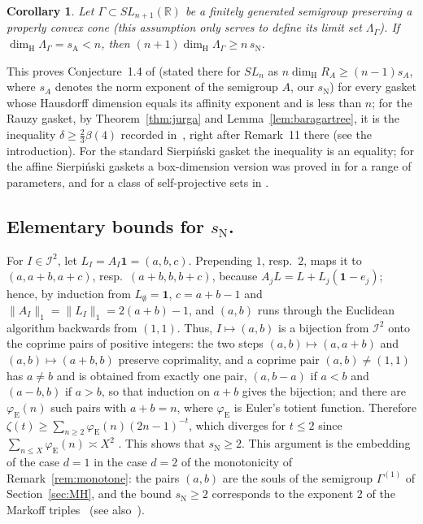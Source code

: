 \documentclass[11pt]{amsart}
\newtheorem{corollary}[proposition]{Corollary}
\theoremstyle{definition}
\theoremstyle{remark}
\newcommand{\one}{\mathbf 1}
\newcommand{\R}{\mathbb R}
\newcommand{\cI}{\mathcal I}
\newcommand{\sN}{s_{\mathrm N}}
\newcommand{\sA}{s_{\mathrm A}}
\newcommand{\dimH}{\dim_{\mathrm H}}
\newcommand{\norm}[1]{\lVert #1\rVert}
\begin{document}
\begin{corollary}\label{cor:main}
Let $\Gamma\subset SL_{n+1}(\R)$ be a finitely generated semigroup preserving a properly convex cone (this assumption only serves to define its limit set $\Lambda_\Gamma$). If $\dimH\Lambda_\Gamma=\sA<n$, then
$(n+1)\dimH\Lambda_\Gamma\ge n\,\sN$.
\end{corollary}

This proves Conjecture~1.4 of \cite{DL15EM} (stated there for $SL_n$ as $n\dimH R_A\ge(n-1)s_A$, where $s_A$ denotes the norm exponent of the semigroup $A$, our $\sN$) for every gasket whose Hausdorff dimension equals its affinity exponent and is less than $n$; for the Rauzy gasket, by Theorem~\ref{thm:jurga} and Lemma~\ref{lem:baragartree}, it is the inequality $\delta\ge\frac23\beta(4)$ recorded in~\cite{GMR19}, right after Remark~11 there (see the introduction). For the standard Sierpi\'nski gasket the inequality is an equality; for the affine Sierpi\'nski gaskets a box-dimension version was proved in \cite[Prop.~3.1]{DL15EM} for a range of parameters, and for a class of self-projective sets in \cite[Thm.~1.8]{Sew23}.

\subsection*{Elementary bounds for $\sN$.}
For $I\in\cI^2$, let $L_I=A_I\one=(a,b,c)$.
Prepending $1$, resp.\ $2$, maps it to $(a,a+b,a+c)$, resp.\ $(a+b,b,b+c)$, because $A_jL=L+L_j(\one-e_j)$; hence, by induction from $L_\emptyset=\one$, $c=a+b-1$ and $\|A_I\|_1=\norm{L_I}_1=2(a+b)-1$, and $(a,b)$ runs through the Euclidean algorithm backwards from $(1,1)$.
Thus, $I\mapsto(a,b)$ is a bijection from $\cI^2$ onto the coprime pairs of positive integers: the two steps $(a,b)\mapsto(a,a+b)$ and $(a,b)\mapsto(a+b,b)$ preserve coprimality, and a coprime pair $(a,b)\ne(1,1)$ has $a\ne b$ and is obtained from exactly one pair, $(a,b-a)$ if $a<b$ and $(a-b,b)$ if $a>b$, so that induction on $a+b$ gives the bijection; and there are $\varphi_{\mathrm E}(n)$ such pairs with $a+b=n$, where $\varphi_{\mathrm E}$ is Euler's totient function.
Therefore $\zeta(t)\ge\sum_{n\ge2}\varphi_{\mathrm E}(n)(2n-1)^{-t}$, which diverges for
$t\le2$ since $\sum_{n\le X}\varphi_{\mathrm E}(n)\asymp X^2$ \cite[Thm.~330]{HW08}.
This shows that $\sN\geq2$. This argument is the embedding of the case $d=1$ in the case $d=2$ of the monotonicity of Remark~\ref{rem:monotone}: the pairs $(a,b)$ are the souls of the semigroup $\Gamma^{(1)}$ of Section~\ref{sec:MH}, and the bound $\sN\ge2$ corresponds to the exponent $2$ of the Markoff triples~\cite[Thm.~0.1]{Bar98} (see also~\cite[Remark~14]{GMR19}).
\end{document}
